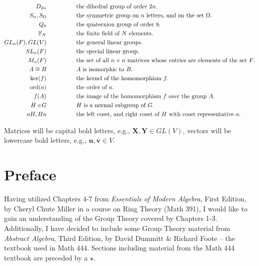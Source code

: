 \documentclass{amsbook}
\DeclareMathOperator{\ord}{\text{ord}}
\begin{document}
\begin{align*}
		D_{2n}             & \hspace*{50pt} \text{the dihedral group of order $2n$.} \\
		S_{n},S_{\Omega}   & \hspace*{50pt} \text{the symmetric group on $n$ letters, and on the set $\Omega$.} \\
		Q_{8}              & \hspace*{50pt} \text{the quaternion group of order 8.} \\
		\mathbb{F}_{N}     & \hspace*{50pt} \text{the finite field of $N$ elements.} \\
		GL_{n}(F),GL(V)    & \hspace*{50pt} \text{the general linear groups.} \\
		SL_{n}(F)          & \hspace*{50pt} \text{the special linear group.} \\
		M_{n}(F)           & \hspace*{50pt} \text{the set of all $n\times n$ matrices whose entries are elements of the set $F$.} \\
		A \cong B          & \hspace*{50pt} \text{$A$ is isomorphic to $B$.} \\
		\ker(f)            & \hspace*{50pt} \text{the kernel of the homomorphism $f$.} \\
		\ord(a)            & \hspace*{50pt} \text{the order of $a$.} \\
		f(A)               & \hspace*{50pt} \text{the image of the homomorphism $f$ over the group $A$.} \\
		H \triangleleft G  & \hspace*{50pt} \text{$H$ is a normal subgroup of $G$.} \\
		aH,Ha              & \hspace*{50pt} \text{the left coset, and right coset of $H$ with coset representative $a$.} \\
	\end{align*}

	Matrices will be capital bold letters, e.g., $\mathbf{X}, \mathbf{Y} \in GL(V)$, vectors will be lowercase bold letters, e.g., $\mathbf{u}, \mathbf{v} \in V$.
	\newpage

	\chapter*{Preface}
	\label{sec:preface}
	Having utilized Chapters 4-7 from \textit{Essentials of Modern Algebra}, First Edition, by Cheryl Chute Miller in a course on Ring Theory (Math 391), I would like to gain an understanding of the Group Theory covered by Chapters 1-3.
	Additionally, I have decided to include some Group Theory material from \textit{Abstract Algebra}, Third Edition, by David Dummitt \& Richard Foote -- the textbook used in Math 444.
	Sections including material from the Math 444 textbook are preceded by a $\star$.
\end{document}
